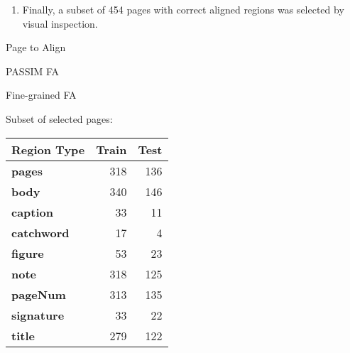 {\begin{enumerate}
    \item Finally, a subset of 454 pages with correct aligned regions
      was selected by visual inspection.
    \end{enumerate}
    \vspace{-1em}%
    \begin{center}
    \begin{minipage}[t]{.2\textwidth}
      \centering
      \setlength{\fboxsep}{0pt}
      Page to Align\\
    \end{minipage}\hspace{.5em}%
    \begin{minipage}[t]{.2\textwidth}
      \centering
      \setlength{\fboxsep}{0pt}
      PASSIM FA\\[.26em]
    \end{minipage}\hspace{.5em}%
    \begin{minipage}[t]{.2\textwidth}
      \centering
      \setlength{\fboxsep}{0pt}
      Fine-grained FA\\
    \end{minipage}\hspace{1.5em}%
    \begin{minipage}[t]{.25\textwidth}
      \centering
      Subset of selected pages:\\[.5em]
      {\scriptsize
      \begin{tabular}[t]{>{\bf}l|rr}
        Region Type & Train & Test \\
        \midrule
        pages       &  318  &  136 \\
        \midrule
        body        &  340  &  146 \\
        caption     &   33  &   11 \\  
        catchword   &   17  &    4 \\   
        figure      &   53  &   23 \\ 
        note        &  318  &  125 \\
        pageNum     &  313  &  135 \\  
        signature   &   33  &   22 \\    
        title       &  279  &  122 \\
        \bottomrule
      \end{tabular}}
    \end{minipage}
    \end{center}
 
    \vspace{-.5em}
}

